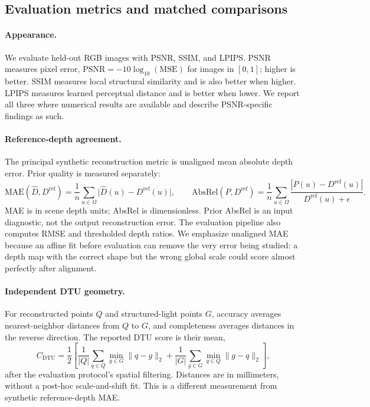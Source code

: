 \documentclass[10pt,a4paper]{article}
\begin{document}
\subsection{Evaluation metrics and matched comparisons}

\paragraph{Appearance.} We evaluate held-out RGB images with PSNR, SSIM, and
LPIPS. PSNR measures pixel error,
$\mathrm{PSNR}=-10\log_{10}(\mathrm{MSE})$ for images in $[0,1]$; higher is better.
SSIM measures local structural similarity and is also better when higher. LPIPS
measures learned perceptual distance and is better when lower. We report all three
where numerical results are available and describe PSNR-specific findings as such.

\paragraph{Reference-depth agreement.} The principal synthetic reconstruction metric
is unaligned mean absolute depth error. Prior quality is measured separately:
\begin{equation}
\mathrm{MAE}(\widehat{D},D^{\mathrm{ref}})=\frac{1}{n}\sum_{u\in\Omega}\bigl|\widehat{D}(u)-D^{\mathrm{ref}}(u)\bigr|,\qquad
\mathrm{AbsRel}(P,D^{\mathrm{ref}})=\frac{1}{n}\sum_{u\in\Omega}\frac{|P(u)-D^{\mathrm{ref}}(u)|}{D^{\mathrm{ref}}(u)+\epsilon}.
\end{equation}
MAE is in scene depth units; AbsRel is dimensionless. Prior AbsRel is an input
diagnostic, not the output reconstruction error. The evaluation pipeline also
computes RMSE and thresholded depth ratios. We emphasize unaligned MAE because an
affine fit before evaluation can remove the very error being studied: a depth map with
the correct shape but the wrong global scale could score almost perfectly after
alignment.

\paragraph{Independent DTU geometry.} For reconstructed points $Q$ and
structured-light points $G$, accuracy averages nearest-neighbor distances from $Q$ to
$G$, and completeness averages distances in the reverse direction. The reported DTU
score is their mean,
\begin{equation}
C_{\mathrm{DTU}}=\frac{1}{2}\left[\frac{1}{|Q|}\sum_{q\in Q}\min_{g\in G}\|q-g\|_2+\frac{1}{|G|}\sum_{g\in G}\min_{q\in Q}\|g-q\|_2\right],
\end{equation}
after the evaluation protocol's spatial filtering. Distances are in millimeters,
without a post-hoc scale-and-shift fit. This is a different measurement from
synthetic reference-depth MAE.
\end{document}
